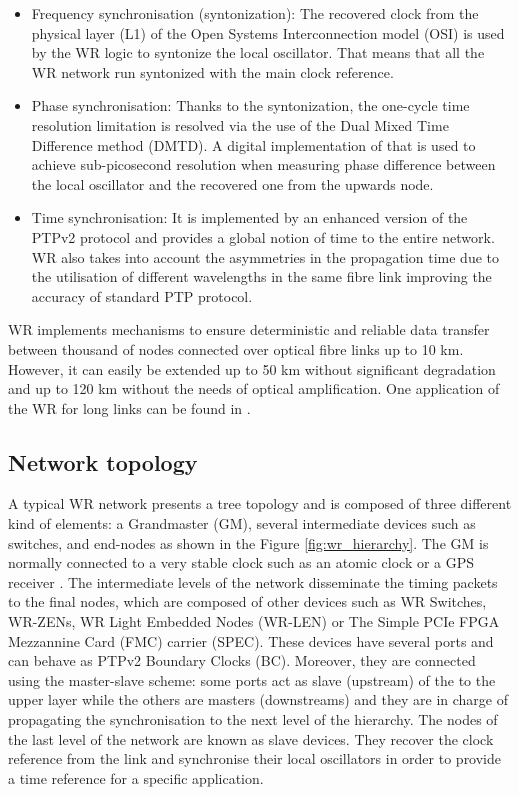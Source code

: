 \begin{itemize}
	
	\item Frequency synchronisation (syntonization): The recovered clock from the physical layer (L1) of the Open Systems Interconnection model (OSI) is used by 
	the WR logic to syntonize the local oscillator. That means that all the WR network run syntonized with the main clock reference.
	
	\item Phase synchronisation: Thanks to the syntonization, the one-cycle time resolution limitation is resolved via the use of the Dual Mixed Time Difference method (DMTD). A digital implementation of that \cite{Moreira2011} is used to achieve sub-picosecond resolution when measuring phase difference between the local oscillator and the recovered one from the upwards node.
	
	\item Time synchronisation: It is implemented by an enhanced version of the PTPv2 protocol and provides a global notion of time to the entire network. WR 
	also takes into account the asymmetries in the propagation time due to the utilisation of different wavelengths in the same fibre link improving the 
	accuracy of standard PTP protocol. 
\end{itemize}

WR implements mechanisms to ensure deterministic and reliable data transfer between thousand of nodes connected over optical fibre links up to 10 km.
However, it can easily be extended up to 50 km without significant degradation and up to 120 km without the needs of optical amplification. One application of the WR for long links can be found in \cite{Kaur2017}.

\subsection{Network topology} \label{subsec:wr-net}

A typical WR network presents a tree topology and is composed of three different
kind of elements: a Grandmaster (GM), several intermediate devices such as
switches, and end-nodes as shown in the Figure \ref{fig:wr_hierarchy}. The GM
is normally connected to a very stable clock such as an atomic clock or a GPS
receiver \cite{Daniluk2012}. The intermediate levels of the network disseminate
the timing packets to the final nodes, which are composed of other devices such
as WR Switches, WR-ZENs, WR Light Embedded Nodes (WR-LEN) or The Simple PCIe FPGA Mezzannine Card (FMC) carrier (SPEC). These devices have several ports and can behave as PTPv2 Boundary Clocks (BC). Moreover, they are connected using the master-slave scheme: some ports act as slave (upstream) of the to the upper layer while the others are masters (downstreams) and they are in charge of propagating the synchronisation to the next level of the hierarchy. The nodes of the last level of the network are known as slave devices. They recover the clock reference from the link and synchronise their local oscillators in order to provide a time reference for a specific application.

